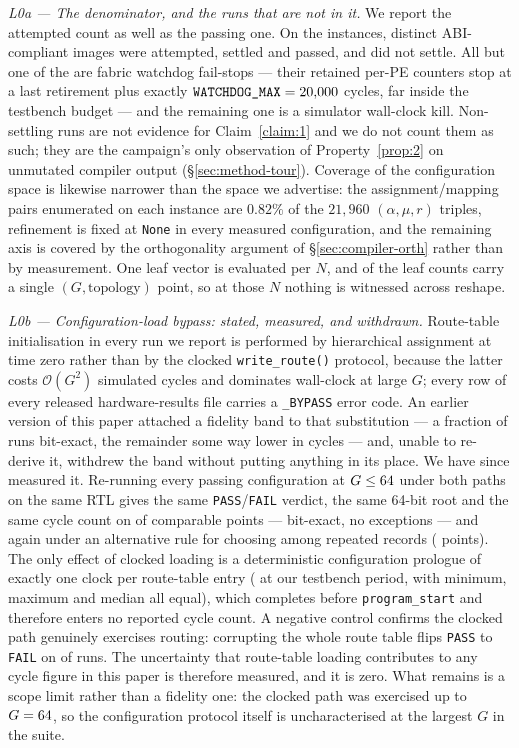 \documentclass[journal,10pt]{IEEEtran}
\theoremstyle{plain}
\theoremstyle{definition}
\theoremstyle{remark}
\newcommand{\sv}[1]{\texttt{#1}}
\newcommand{\asgn}{\ensuremath{\alpha}}
\newcommand{\map}{\ensuremath{\mu}}
\begin{document}
\emph{L0a --- The denominator, and the runs that are not in it.} We report the
attempted count as well as the passing one. On the \TournNInst{} instances,
\InvAttempted{} distinct ABI-compliant images were attempted, \WallTBs{}
settled and passed, and \InvNonSettling{} did not settle. All but one of the
\InvNonSettling{} are fabric watchdog fail-stops --- their retained per-PE
counters stop at a last retirement plus exactly $\sv{WATCHDOG\_MAX} =
\WatchdogMax$ cycles, far inside the testbench budget --- and the remaining
one is a simulator wall-clock kill. Non-settling runs are not evidence for
Claim~\ref{claim:1} and we do not count them as such; they are the campaign's
only observation of Property~\ref{prop:2} on unmutated compiler output
(\S\ref{sec:method-tour}). Coverage of the configuration space is likewise
narrower than the space we advertise: the \SelConfigsTotal{}
assignment/mapping pairs enumerated on each instance are $0.82\%$ of the
$21{,}960$ $(\asgn,\map,r)$ triples, refinement is fixed at \sv{None} in every
measured configuration, and the remaining axis is covered by the orthogonality
argument of \S\ref{sec:compiler-orth} rather than by measurement. One leaf
vector is evaluated per $N$, and \InvSingletonRows{} of the \InvLeafCounts{}
leaf counts carry a single $(G,\text{topology})$ point, so at those $N$
nothing is witnessed across reshape.

\emph{L0b --- Configuration-load bypass: stated, measured, and withdrawn.}
Route-table initialisation in every run we report is performed by hierarchical
assignment at time zero rather than by the clocked \sv{write\_route()}
protocol, because the latter costs $\mathcal{O}(G^2)$ simulated cycles and
dominates wall-clock at large $G$; every row of every released
hardware-results file carries a \sv{\_BYPASS} error code. An earlier version
of this paper attached a fidelity band to that substitution --- a fraction of
runs bit-exact, the remainder some way lower in cycles --- and, unable to
re-derive it, withdrew the band without putting anything in its place. We have
since measured it. Re-running every passing configuration at $G \le 64$
under both paths on the same RTL gives the same \sv{PASS}/\sv{FAIL} verdict, the same
64-bit root and the same cycle count on \RouteRuns{} of \RouteRuns{}
comparable points --- \RouteBitExact{} bit-exact, no exceptions --- and
\RouteBitExact{} again under an alternative rule for choosing among repeated
records (\RouteAltRuns{} points). The only effect of clocked loading is a
deterministic configuration prologue of exactly one clock per route-table
entry (\RouteFillTime{} at our testbench period, with minimum, maximum and
median all equal), which completes before \sv{program\_start} and therefore
enters no reported cycle count. A negative control confirms the clocked path
genuinely exercises routing: corrupting the whole route table flips \sv{PASS}
to \sv{FAIL} on \RouteNegCtrl{} of \RouteNegCtrl{} runs. The uncertainty that
route-table loading contributes to any cycle figure in this paper is therefore
measured, and it is zero. What remains is a scope limit rather than a fidelity
one: the clocked path was exercised up to $G = 64$, so the
configuration protocol itself is uncharacterised at the largest $G$ in the
suite.
\end{document}
